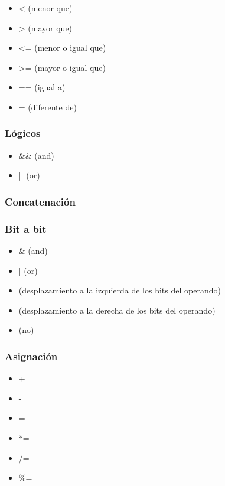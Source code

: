 \documentclass[12pt]{article}
\begin{document}
\begin{itemize}
\item < (menor que)
\item > (mayor que)
\item <= (menor o igual que)
\item >= (mayor o igual que)
\item == (igual a)
\item \!= (diferente de)
\end{itemize}

\subsubsection{L\'ogicos}
\begin{itemize}
\item \&\& (and)
\item || (or)
\end{itemize}

\subsubsection{Concatenaci\'on}
\itemize{+}

\subsubsection{Bit a bit}

\begin{itemize}
\item \& (and)
\item | (or)
\item \<\< (desplazamiento a la izquierda de los bits del operando)
\item \>\> (desplazamiento a la derecha de los bits del operando)
\item \! (no)
\end{itemize}

\subsubsection{Asignaci\'on}

\begin{itemize}
\item +=
\item -=
\item =
\item *=
\item /=
\item \%=
\end{itemize}
\end{document}

